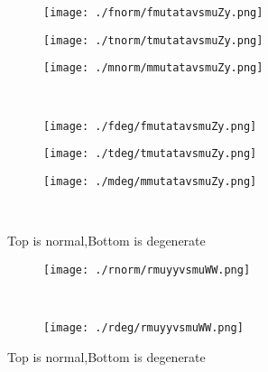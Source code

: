\documentclass[aps,floats,floatfix,nofootinbib]{revtex4-1}
\begin{document}
\begin{center}
\begin{figure}
\begin{subfigure}{0.3\textwidth}
\texttt{[image: ./fnorm/fmutatavsmuZy.png]}
\label{}
\end{subfigure}
\begin{subfigure}{0.3\textwidth}
\texttt{[image: ./tnorm/tmutatavsmuZy.png]}
\label{}
\end{subfigure}
\begin{subfigure}{0.3\textwidth}
\texttt{[image: ./mnorm/mmutatavsmuZy.png]}
\label{}
\end{subfigure}\\
\begin{subfigure}{0.3\textwidth}
\texttt{[image: ./fdeg/fmutatavsmuZy.png]}
\label{}
\end{subfigure}
\begin{subfigure}{0.3\textwidth}
\texttt{[image: ./tdeg/tmutatavsmuZy.png]}
\label{}
\end{subfigure}
\begin{subfigure}{0.3\textwidth}
\texttt{[image: ./mdeg/mmutatavsmuZy.png]}
\label{}
\end{subfigure}\\
\caption{Top is normal,Bottom is degenerate}
\end{figure}
\end{center}

\begin{center}
\begin{figure}
\begin{subfigure}{1.0\textwidth}
\texttt{[image: ./rnorm/rmuyyvsmuWW.png]}
\label{}
\end{subfigure}\\
\begin{subfigure}{1.0\textwidth}
\texttt{[image: ./rdeg/rmuyyvsmuWW.png]}
\label{}
\end{subfigure}
\caption{Top is normal,Bottom is degenerate}
\end{figure}
\end{center}
\end{document}
